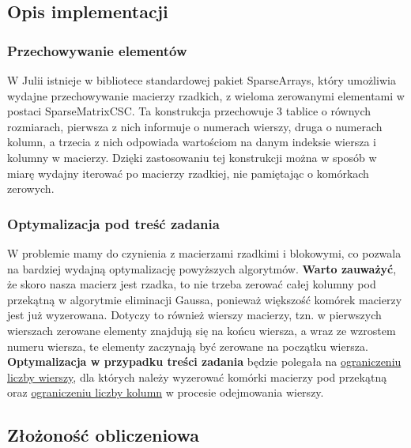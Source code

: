 \documentclass{article}
\begin{document}
\subsection{Opis implementacji}
\subsubsection{Przechowywanie elementów}
W Julii istnieje w bibliotece standardowej pakiet SparseArrays, który umożliwia wydajne przechowywanie macierzy rzadkich, z wieloma zerowanymi elementami w postaci SparseMatrixCSC. Ta konstrukcja przechowuje 3 tablice o równych rozmiarach, pierwsza z nich informuje o numerach wierszy, druga o numerach kolumn, a trzecia z nich odpowiada wartościom na danym indeksie wiersza i kolumny w macierzy. Dzięki zastosowaniu tej konstrukcji można w sposób w miarę wydajny iterować po macierzy rzadkiej, nie pamiętając o komórkach zerowych.
\subsubsection{Optymalizacja pod treść zadania}
W problemie mamy do czynienia z macierzami rzadkimi i blokowymi, co pozwala na bardziej wydajną optymalizację powyższych algorytmów. \textbf{Warto zauważyć}, że skoro nasza macierz jest rzadka, to nie trzeba zerować całej kolumny pod przekątną w algorytmie eliminacji Gaussa, ponieważ większość komórek macierzy jest już wyzerowana. Dotyczy to również wierszy macierzy, tzn. w pierwszych wierszach zerowane elementy znajdują się na końcu wiersza, a wraz ze wzrostem numeru wiersza, te elementy zaczynają być zerowane na początku wiersza. \textbf{Optymalizacja w przypadku treści zadania} będzie polegała na \underline{ograniczeniu liczby wierszy}, dla których należy wyzerować komórki macierzy pod przekątną oraz \underline{ograniczeniu liczby kolumn} w procesie odejmowania wierszy.   
\subsection{Złożoność obliczeniowa}
\end{document}
